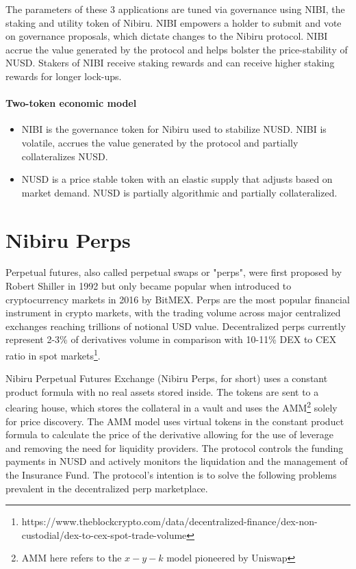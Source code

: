 \documentclass[11pt]{article}
\begin{document}
The parameters of these 3 applications are tuned via governance using NIBI, the staking and utility token of Nibiru. NIBI empowers a holder to submit and vote on governance proposals, which dictate changes to the Nibiru protocol. NIBI accrue the value generated by the protocol and helps bolster the price-stability of NUSD. Stakers of NIBI receive staking rewards and can receive higher staking rewards for longer lock-ups. 

\subsection*{Two-token economic model}
\begin{itemize}
\item NIBI is the governance token for Nibiru used to stabilize NUSD. NIBI is volatile, accrues the value generated by the protocol and partially collateralizes NUSD.
\item NUSD is a price stable token with an elastic supply that adjusts based on market demand. NUSD is partially algorithmic and partially collateralized.
\vfill
  
\end{itemize}

\twocolumn
\part{Nibiru Perps}\label{x/perp}

Perpetual futures, also called perpetual swaps or "perps", were first proposed by Robert Shiller in 1992 but only became popular when introduced to cryptocurrency markets in 2016 by BitMEX. Perps are the most popular financial instrument in crypto markets, with the trading volume across major centralized exchanges reaching trillions of notional USD value. Decentralized perps currently represent 2-3\% of derivatives volume in comparison with 10-11\% DEX to CEX ratio in spot markets\footnote{ https://www.theblockcrypto.com/data/decentralized-finance/dex-non-custodial/dex-to-cex-spot-trade-volume}.

Nibiru Perpetual Futures Exchange (Nibiru Perps, for short) uses a constant product formula with no real assets stored inside. The tokens are sent to a clearing house, which stores the collateral in a vault and uses the AMM\footnote{AMM here refers to the $x-y-k$ model pioneered by Uniswap} solely for price discovery. The AMM model uses virtual tokens in the constant product formula to calculate the price of the derivative allowing for the use of leverage and removing the need for liquidity providers. The protocol controls the funding payments in NUSD and actively monitors the liquidation and the management of the Insurance Fund. The protocol’s intention is to solve the following problems prevalent in the decentralized perp marketplace. 
\end{document}
